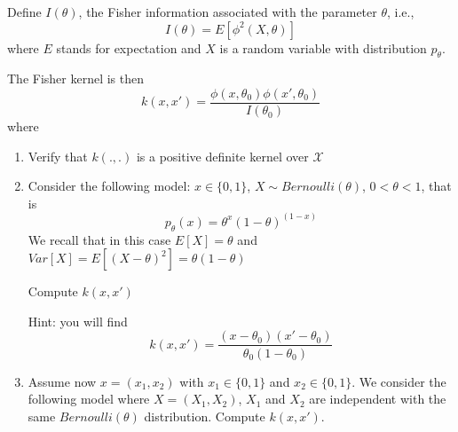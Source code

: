 \documentclass{article}[12pt]
\begin{document}
Define $I(\theta)$, the Fisher information associated with the parameter $\theta$, i.e., 
\begin{equation}
I(\theta)=E[\phi^2(X,\theta)]
\end{equation}
where $E$ stands for expectation and $X$ is a random variable with distribution $p_\theta$. 

The Fisher kernel is then 
\begin{equation}
k(x,x')=\frac{\phi(x,\theta_0)\phi(x',\theta_0)}{I(\theta_0)}
\end{equation}
where 
\begin{enumerate}
\item Verify that $k(.,.)$ is a positive definite kernel over $\mathcal{X}$
\item Consider the following model: $x \in \{0,1\}$, $X \sim Bernoulli(\theta)$, $0 < \theta < 1$, that is
\begin{equation}
p_\theta(x)=\theta^x(1-\theta)^{(1-x)} 
\end{equation}
We recall that in this case $E[X]=\theta$ and $Var[X]=E[(X-\theta)^2]=\theta(1-\theta)$

Compute $k(x,x')$

Hint: you will find $$k(x,x')=\frac{(x-\theta_0)(x'-\theta_0)}{\theta_0(1-\theta_0)}$$
\item
Assume now $x=(x_1,x_2)$ with $x_1 \in \{0,1\}$ and $x_2 \in \{0,1\}$. 
We consider the following model where $X=(X_1,X_2)$, $X_1$ and $X_2$ are independent with the same $Bernoulli(\theta)$ distribution. 
Compute $k(x,x')$. 
\end{enumerate}
 
\end{document}

